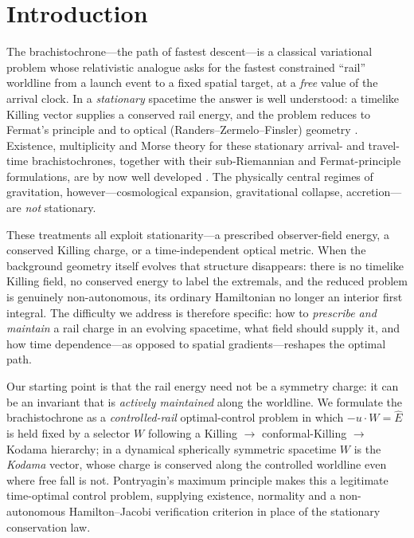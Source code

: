 \documentclass[12pt]{iopart}
\newcommand{\Ehat}{\hat E}
\begin{document}
\section{Introduction}
\label{sec:intro}
The brachistochrone---the path of fastest descent---is a classical variational problem
whose relativistic analogue asks for the fastest constrained ``rail'' worldline from a
launch event to a fixed spatial target, at a \emph{free} value of the arrival clock. In a
\emph{stationary} spacetime the answer is well understood: a timelike Killing vector
supplies a conserved rail energy, and the problem reduces to Fermat's principle and to
optical (Randers--Zermelo--Finsler) geometry
\cite{Perlick1991,PerlickRayOptics,Kovner1990,Randers1941,GibbonsWerner2008,GibbonsRanders2009,BaoRoblesShen}.
Existence, multiplicity and Morse theory for these stationary arrival- and travel-time
brachistochrones, together with their sub-Riemannian and Fermat-principle formulations,
are by now well developed
\cite{GiannoniPiccioneVerderesi1997,GiannoniPiccioneTausk2002,GiannoniPiccione2002,CaponioJavaloyes2026}.
The physically central regimes of gravitation, however---cosmological expansion,
gravitational collapse, accretion---are \emph{not} stationary.

These treatments all exploit stationarity---a prescribed observer-field energy, a
conserved Killing charge, or a time-independent optical metric. When the background
geometry itself evolves that structure disappears: there is no timelike Killing field, no
conserved energy to label the extremals, and the reduced problem is genuinely
non-autonomous, its ordinary Hamiltonian no longer an interior first integral. The
difficulty we address is therefore specific: how to \emph{prescribe and maintain} a rail
charge in an evolving spacetime, what field should supply it, and how time
dependence---as opposed to spatial gradients---reshapes the optimal path.

Our starting point is that the rail energy need not be a symmetry charge: it can be an
invariant that is \emph{actively maintained} along the worldline. We formulate the
brachistochrone as a \emph{controlled-rail} optimal-control problem in which
$-u\cdot W=\Ehat$ is held fixed by a selector $W$ following a Killing $\to$
conformal-Killing $\to$ Kodama hierarchy; in a dynamical spherically symmetric spacetime
$W$ is the \emph{Kodama} vector, whose charge is conserved along the controlled worldline
even where free fall is not. Pontryagin's maximum principle makes this a legitimate
time-optimal control problem, supplying existence, normality and a non-autonomous
Hamilton--Jacobi verification criterion in place of the stationary conservation law.
\end{document}
